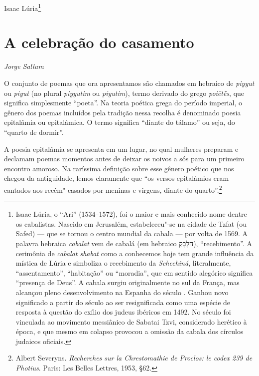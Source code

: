 \begin{flushright}
Isaac Lúria\footnote{Isaac Lúria, o ``Ari'' (1534--1572), foi o maior e mais conhecido nome dentre os cabalistas. Nascido em Jerusalém, estabeleceu"-se na cidade de Tzfat (ou Safed) --- que se tornou o centro mundial da cabala --- por volta de 1569. A palavra hebraica \emph{cabalat} vem de cabalá (em hebraico הלָבָּקַ), ``recebimento''. A cerimônia de \emph{cabalat shabat} como a conhecemos hoje tem grande influência da mística de Lúria e simboliza o recebimento da \emph{Schechiná}, literalmente, ``assentamento'', ``habitação'' ou ``moradia'', que em sentido alegórico significa ``presença de Deus''. A cabala surgiu originalmente no sul da França, mas alcançou pleno desenvolvimento na Espanha do século . Ganhou novo significado a partir do século  ao ser resignificada como uma espécie de resposta à questão do exílio dos judeus ibéricos em 1492. No século  foi vinculada ao movimento messiânico de Sabatai Tzvi, considerado herético à época, e que mesmo em colapso provocou a omissão da cabala dos círculos judaicos oficiais.}
\end{flushright}

\chapter*{A celebração do casamento}

\begin{flushright}
\emph{Jorge Sallum}
\end{flushright}

O conjunto de poemas que ora apresentamos são chamados em hebraico de
\emph{piyyut} ou \emph{piyut} (no plural \emph{piyyutim} ou
\emph{piyutim}), termo derivado do grego \emph{poiētḗs}, que significa
simplesmente ``poeta''. Na
teoria poética grega do período imperial, o gênero dos poemas incluídos
pela tradição nessa recolha é denominado poesia epitalâmia ou
epitalâmica. O termo significa ``diante do tálamo'' ou seja, do ``quarto
de dormir''.


A poesia epitalâmia se apresenta em um lugar, no qual mulheres
preparam e declamam poemas momentos antes de deixar os noivos a sós para
um primeiro encontro amoroso. Na raríssima definição sobre esse gênero
poético que nos chegou da antiguidade, lemos claramente que ``os versos
epitalâmios eram cantados aos recém"-casados por meninas e virgens,
diante do quarto''.\footnote{Albert Severyns. \emph{Recherches sur la Chrestomathie de Proclos: le codex 239 de Photius}. Paris: Les Belles Lettres, 1953, §62.}

